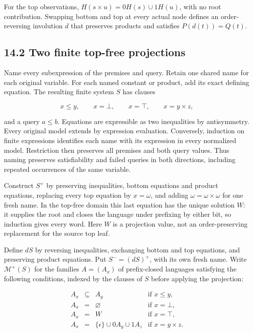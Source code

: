 \documentclass[
  11pt,
  a4paper,
]{article}
\begin{document}
For the top observations, \(H(s\times u)=0H(s)\cup1H(u)\), with no root
contribution. Swapping bottom and top at every actual node defines an
order-reversing involution \(d\) that preserves products and satisfies
\(P(d(t))=Q(t)\).

\subsection{14.2 Two finite top-free
projections}\label{two-finite-top-free-projections}

Name every subexpression of the premises and query. Retain one shared
name for each original variable. For each named constant or product, add
its exact defining equation. The resulting finite system \(S\) has
clauses

\[x\le y,\qquad x=\bot,\qquad x=\top,\qquad x=y\times z,\]

and a query \(a\le b\). Equations are expressible as two inequalities by
antisymmetry. Every original model extends by expression evaluation.
Conversely, induction on finite expressions identifies each name with
its expression in every normalized model. Restriction then preserves all
premises and both query values. Thus naming preserves satisfiability and
failed queries in both directions, including repeated occurrences of the
same variable.

Construct \(S^+\) by preserving inequalities, bottom equations and
product equations, replacing every top equation by \(x=\omega\), and
adding \(\omega=\omega\times\omega\) for one fresh name. In the top-free
domain this last equation has the unique solution \(W\): it supplies the
root and closes the language under prefixing by either bit, so induction
gives every word. Here \(W\) is a projection value, not an
order-preserving replacement for the source top leaf.

Define \(dS\) by reversing inequalities, exchanging bottom and top
equations, and preserving product equations. Put \(S^-=(dS)^+\), with
its own fresh name. Write \(\mathcal M^+(S)\) for the families
\(A=(A_x)\) of prefix-closed languages satisfying the following
conditions, indexed by the clauses of \(S\) before applying the
projection:

\[\begin{array}{rcll}
A_x&\subseteq&A_y&\text{if }x\le y,\\
A_x&=&\varnothing&\text{if }x=\bot,\\
A_x&=&W&\text{if }x=\top,\\
A_x&=&\{\epsilon\}\cup0A_y\cup1A_z&\text{if }x=y\times z.
\end{array}\]
\end{document}
